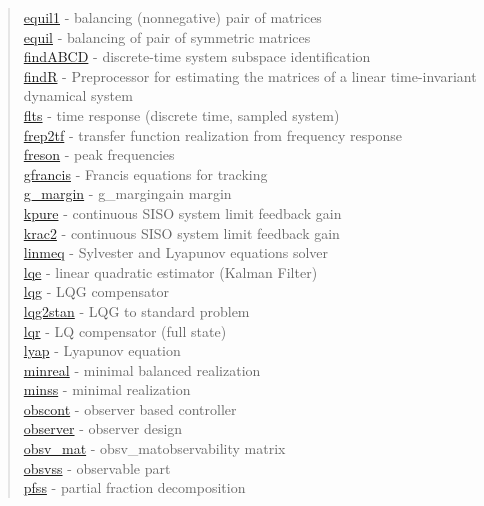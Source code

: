\begin{quote}
\hyperlink{equil1}{equil1} - {balancing (nonnegative) pair of matrices} \\  
\hyperlink{equil}{equil} - {balancing of pair of symmetric matrices} \\  
\hyperlink{findABCD}{findABCD} - {discrete-time system subspace identification} \\  
\hyperlink{findR}{findR} - {Preprocessor for estimating the matrices of a linear time-invariant dynamical system} \\  
\hyperlink{flts}{flts} - {time response (discrete time, sampled system)  } \\  
\hyperlink{frep2tf}{frep2tf} - {transfer function realization from frequency response} \\  
\hyperlink{freson}{freson} - {peak frequencies} \\  
\hyperlink{gfrancis}{gfrancis} - {Francis equations for tracking} \\  
\hyperlink{g_margin}{g\_margin} - {g_margin}{gain margin} \\  
\hyperlink{kpure}{kpure} - {continuous SISO system limit feedback gain} \\  
\hyperlink{krac2}{krac2} - {continuous SISO system limit feedback gain} \\  
\hyperlink{linmeq}{linmeq} - {Sylvester and Lyapunov equations solver} \\
\hyperlink{lqe}{lqe} - {linear quadratic estimator (Kalman Filter)} \\ 
\hyperlink{lqg}{lqg} - {LQG compensator} \\  
\hyperlink{lqg2stan}{lqg2stan} - {LQG to standard problem} \\  
\hyperlink{lqr}{lqr} - {LQ compensator (full state)} \\ %
\hyperlink{lyap}{lyap} - {Lyapunov equation} \\  
\hyperlink{minreal}{minreal} - {minimal balanced realization} \\  
\hyperlink{minss}{minss} - {minimal realization} \\  
\hyperlink{obscont}{obscont} - {observer based controller} \\  
\hyperlink{observer}{observer} - {observer design} \\  
\hyperlink{obsv_mat}{obsv\_mat} - {obsv_mat}{observability matrix} \\  
\hyperlink{obsvss}{obsvss} - {observable part} \\  
\hyperlink{pfss}{pfss} - {partial fraction decomposition} \\  

\end{quote}
